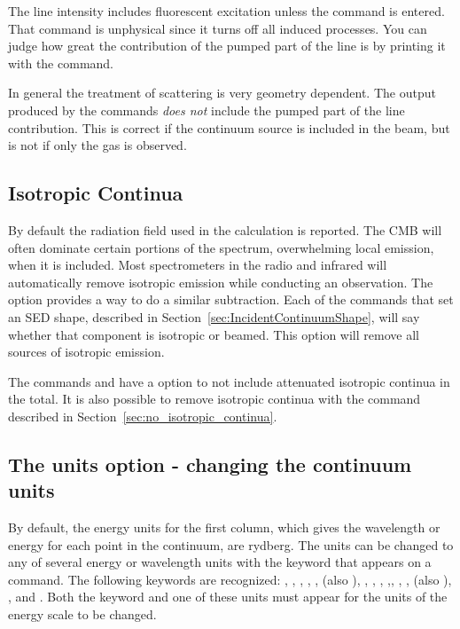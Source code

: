 The line intensity includes fluorescent excitation unless the
 command is entered.
That command is unphysical since it turns
off all induced processes.
You can judge how great the contribution of
the pumped part of the line is by printing it with the
 command.

In general the treatment of scattering is very geometry dependent.
The
output produced by the  commands \emph{does not} include the pumped
part of the line contribution.
This is correct if the continuum source
is included in the beam, but is not if only the gas is observed.

\subsection{Isotropic Continua}
\label{sec:save_cont_no_isotropic_option}

\par
By default the radiation field used in the calculation is reported. 
The CMB will often dominate certain portions of the spectrum,
overwhelming local emission, when it is included.
Most spectrometers in the radio and infrared will automatically remove  
isotropic emission while conducting an observation.
The  option provides a way to do a similar subtraction.
Each of the commands that set an SED shape,
described in Section~\ref{sec:IncidentContinuumShape}, will say
whether that component is isotropic or beamed.
This option will remove all sources of isotropic emission.

The commands
 and
have a  option
to not include attenuated isotropic continua in the total.
It is also possible to remove isotropic continua with the
  command described
in Section~\ref{sec:no_isotropic_continua}.

\subsection{The units option - changing the continuum units}
\label{output_units}
\label{units_option}

By default, the energy units for the first column, which gives the
wavelength or energy for each point in the continuum, are rydberg.  The
units can be changed to any of several energy or wavelength units with the
 keyword that appears on a  command.  The following
keywords are recognized: , , ,
, ,  (also
), , , ,
,, , ,
 (also ), , and
.
Both the keyword  and one of
these units must appear for the units of the energy scale to be changed.

